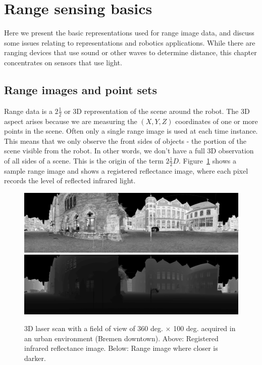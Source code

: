 \documentclass[twocolumn,oneside]{book}
\begin{document}
\section{Range sensing basics \label{sec31.1}}

Here we present the basic representations used for range image data,
and discuss some issues relating to representations and robotics
applications.  While there are ranging devices that use sound or other
waves to determine distance, this chapter concentrates on sensors that
use light.

\subsection{Range images and point sets} \label{sec31.1.1}

 Range data is a $2\frac{1}{2}$ or 3D representation
of the scene around the robot. The 3D aspect arises because we are
measuring the $(X,Y,Z)$ coordinates of one or more points in the
scene.  Often only a single  range image is used at
each time instance.  This means that we only observe the front sides
of objects - the portion of the scene visible from the robot.  In
other words, we don't have a full 3D observation of all sides of a
scene.  This is the origin of the term
$2\frac{1}{2}D$. Figure~\ref{fig23.1} shows a sample range image and
shows a  registered reflectance
image, where each pixel records the level of reflected infrared light.
\begin{figure}
  \includegraphics[width=\linewidth]{BOOKFIGS/scan007_EQUIRECTANGULAR}\\[1ex]
  \includegraphics[width=\linewidth]{BOOKFIGS/scan007_EQUIRECTANGULAR_depth_1}
  \caption{3D laser scan with a field of view of 360 deg. $\times$ 100
    deg. acquired in an urban environment (Bremen downtown).  Above:
    Registered infrared reflectance image.  Below: Range image where
    closer is darker.
\label{fig23.1}}
\end{figure}
\end{document}
